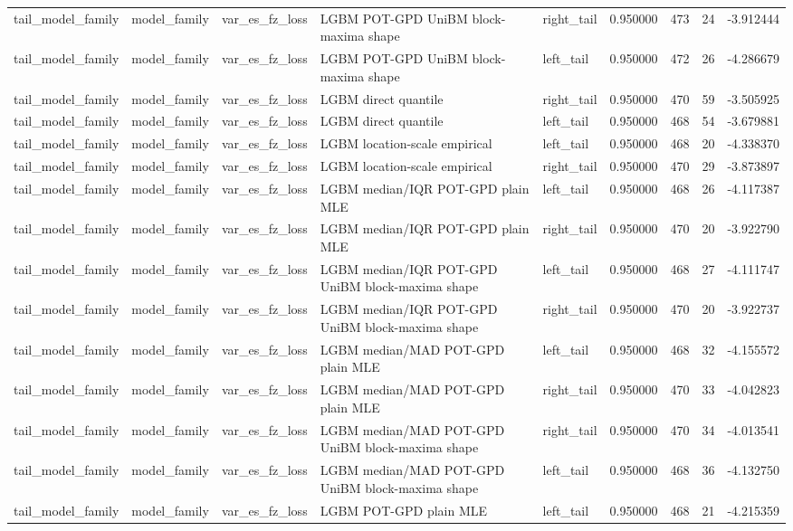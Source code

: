 \begin{tabular}{lllllrrr}
tail\_model\_family & model\_family & var\_es\_fz\_loss & LGBM POT-GPD UniBM block-maxima shape & right\_tail & 0.950000 & 473 & 24 & -3.912444 \\
tail\_model\_family & model\_family & var\_es\_fz\_loss & LGBM POT-GPD UniBM block-maxima shape & left\_tail & 0.950000 & 472 & 26 & -4.286679 \\
tail\_model\_family & model\_family & var\_es\_fz\_loss & LGBM direct quantile & right\_tail & 0.950000 & 470 & 59 & -3.505925 \\
tail\_model\_family & model\_family & var\_es\_fz\_loss & LGBM direct quantile & left\_tail & 0.950000 & 468 & 54 & -3.679881 \\
tail\_model\_family & model\_family & var\_es\_fz\_loss & LGBM location-scale empirical & left\_tail & 0.950000 & 468 & 20 & -4.338370 \\
tail\_model\_family & model\_family & var\_es\_fz\_loss & LGBM location-scale empirical & right\_tail & 0.950000 & 470 & 29 & -3.873897 \\
tail\_model\_family & model\_family & var\_es\_fz\_loss & LGBM median/IQR POT-GPD plain MLE & left\_tail & 0.950000 & 468 & 26 & -4.117387 \\
tail\_model\_family & model\_family & var\_es\_fz\_loss & LGBM median/IQR POT-GPD plain MLE & right\_tail & 0.950000 & 470 & 20 & -3.922790 \\
tail\_model\_family & model\_family & var\_es\_fz\_loss & LGBM median/IQR POT-GPD UniBM block-maxima shape & left\_tail & 0.950000 & 468 & 27 & -4.111747 \\
tail\_model\_family & model\_family & var\_es\_fz\_loss & LGBM median/IQR POT-GPD UniBM block-maxima shape & right\_tail & 0.950000 & 470 & 20 & -3.922737 \\
tail\_model\_family & model\_family & var\_es\_fz\_loss & LGBM median/MAD POT-GPD plain MLE & left\_tail & 0.950000 & 468 & 32 & -4.155572 \\
tail\_model\_family & model\_family & var\_es\_fz\_loss & LGBM median/MAD POT-GPD plain MLE & right\_tail & 0.950000 & 470 & 33 & -4.042823 \\
tail\_model\_family & model\_family & var\_es\_fz\_loss & LGBM median/MAD POT-GPD UniBM block-maxima shape & right\_tail & 0.950000 & 470 & 34 & -4.013541 \\
tail\_model\_family & model\_family & var\_es\_fz\_loss & LGBM median/MAD POT-GPD UniBM block-maxima shape & left\_tail & 0.950000 & 468 & 36 & -4.132750 \\
tail\_model\_family & model\_family & var\_es\_fz\_loss & LGBM POT-GPD plain MLE & left\_tail & 0.950000 & 468 & 21 & -4.215359 \\

\end{tabular}
